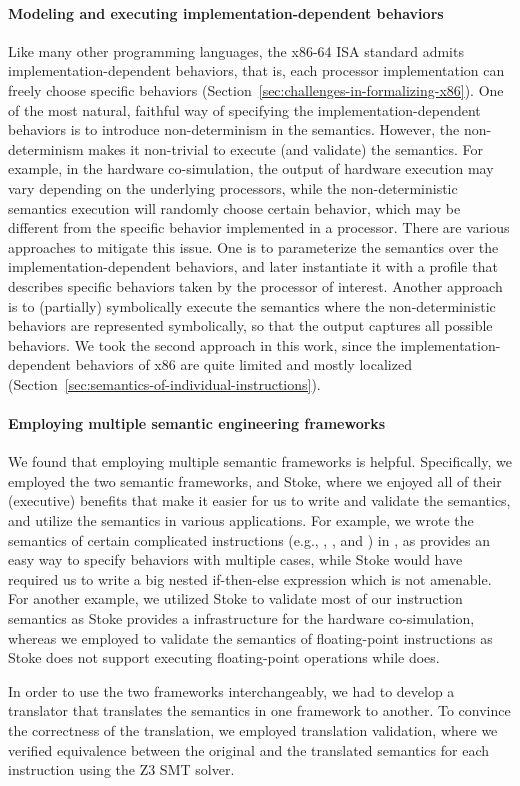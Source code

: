 {\paragraph{Modeling and executing implementation-dependent behaviors}

Like many other programming languages, the x86-64 ISA standard admits implementation-dependent behaviors, that is, each processor implementation can freely choose specific behaviors (Section~\ref{sec:challenges-in-formalizing-x86}). One of the most natural, faithful way of specifying the implementation-dependent behaviors is to introduce non-determinism in the semantics. However, the non-determinism makes it non-trivial to execute (and validate) the semantics. For example, in the hardware co-simulation, the output of hardware execution may vary depending on the underlying processors, while the non-deterministic semantics execution will randomly choose certain behavior, which may be different from the specific behavior implemented in a processor. There are various approaches to mitigate this issue. One is to parameterize the semantics over the implementation-dependent behaviors, and later instantiate it with a profile that describes specific behaviors taken by the processor of interest. Another approach is to (partially) symbolically execute the semantics where the non-deterministic behaviors are represented symbolically, so that the output captures all possible behaviors. We took the second approach in this work, since the implementation-dependent behaviors of x86 are quite limited and mostly localized (Section~\ref{sec:semantics-of-individual-instructions}).

\paragraph{Employing multiple semantic engineering frameworks}

We found that employing multiple semantic frameworks is helpful. Specifically, we employed the two semantic frameworks, \K and Stoke, where we enjoyed all of their (executive) benefits that make it easier for us to write and validate the semantics, and utilize the semantics in various applications. For example, we wrote the semantics of certain complicated instructions (e.g., , , and ) in \K, as \K provides an easy way to specify behaviors with multiple cases, while Stoke would have required us to write a big nested if-then-else expression which is not amenable. For another example, we utilized Stoke to validate most of our instruction semantics as Stoke provides a infrastructure for the hardware co-simulation, whereas we employed \K to validate the semantics of floating-point instructions as Stoke does not support executing floating-point operations while \K does.

In order to use the two frameworks interchangeably, we had to develop a translator that translates the semantics in one framework to another. To convince the correctness of the translation, we employed translation validation, where we verified equivalence between the original and the translated semantics for each instruction using the Z3 SMT solver.

}
